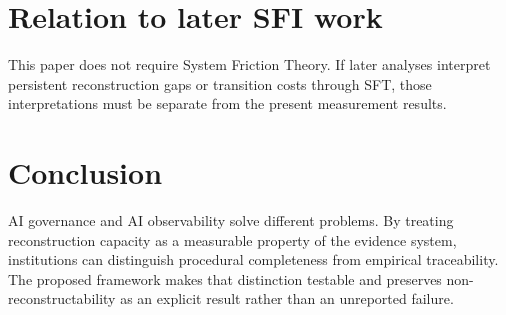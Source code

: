 \documentclass[11pt]{article}
\begin{document}
\section{Relation to later SFI work}
This paper does not require System Friction Theory. If later analyses interpret persistent reconstruction gaps or transition costs through SFT, those interpretations must be separate from the present measurement results.

\section{Conclusion}
AI governance and AI observability solve different problems. By treating reconstruction capacity as a measurable property of the evidence system, institutions can distinguish procedural completeness from empirical traceability. The proposed framework makes that distinction testable and preserves non-reconstructability as an explicit result rather than an unreported failure.
\end{document}
